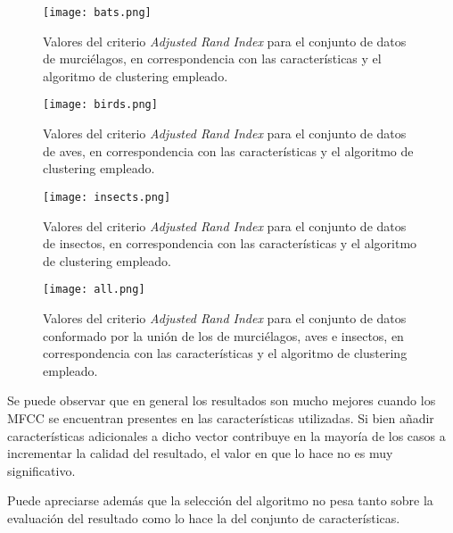 \begin{figure}[!h]
    \centering
    \texttt{[image: bats.png]}
    \caption{Valores del criterio \textit{Adjusted Rand Index} para el conjunto de datos de murciélagos, en correspondencia con las características y el algoritmo de clustering empleado.}
    \label{img:bats}
\end{figure}

\begin{figure}[!h]
    \centering
    \texttt{[image: birds.png]}
    \caption{Valores del criterio \textit{Adjusted Rand Index} para el conjunto de datos de aves, en correspondencia con las características y el algoritmo de clustering empleado.}
    \label{img:birds}
\end{figure}

\begin{figure}[!h]
    \centering
    \texttt{[image: insects.png]}
    \caption{Valores del criterio \textit{Adjusted Rand Index} para el conjunto de datos de insectos, en correspondencia con las características y el algoritmo de clustering empleado.}
    \label{img:insects}
\end{figure}

\begin{figure}[!h]
    \centering
    \texttt{[image: all.png]}
    \caption{Valores del criterio \textit{Adjusted Rand Index} para el conjunto de datos conformado por la unión de los de murciélagos, aves e insectos, en correspondencia con las características y el algoritmo de clustering empleado.}
    \label{img:all}
\end{figure}

Se puede observar que en general los resultados son mucho mejores cuando los MFCC se encuentran presentes en las características utilizadas.
Si bien añadir características adicionales a dicho vector contribuye en la mayoría de los casos a incrementar la calidad del resultado, el valor en que lo hace no es muy significativo.

Puede apreciarse además que la selección del algoritmo no pesa tanto sobre la evaluación del resultado como lo hace la del conjunto de características.
